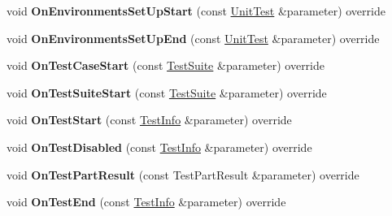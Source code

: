 \begin{DoxyCompactItemize}
void {\bfseries On\+Environments\+Set\+Up\+Start} (const \mbox{\hyperlink{classtesting_1_1UnitTest}{Unit\+Test}} \&parameter) override
\item 
\mbox{\label{classtesting_1_1internal_1_1TestEventRepeater_a82deba4c0631274c7a519b15e57b7d8b}} 
void {\bfseries On\+Environments\+Set\+Up\+End} (const \mbox{\hyperlink{classtesting_1_1UnitTest}{Unit\+Test}} \&parameter) override
\item 
\mbox{\label{classtesting_1_1internal_1_1TestEventRepeater_a76cf742eacd1c048b81dc3a1138f55ab}} 
void {\bfseries On\+Test\+Case\+Start} (const \mbox{\hyperlink{classtesting_1_1TestSuite}{Test\+Suite}} \&parameter) override
\item 
\mbox{\label{classtesting_1_1internal_1_1TestEventRepeater_aa54fdafe6dfdd46dbac108c17016a5f9}} 
void {\bfseries On\+Test\+Suite\+Start} (const \mbox{\hyperlink{classtesting_1_1TestSuite}{Test\+Suite}} \&parameter) override
\item 
\mbox{\label{classtesting_1_1internal_1_1TestEventRepeater_a17b0fcb394e3b967230d059fc83f5589}} 
void {\bfseries On\+Test\+Start} (const \mbox{\hyperlink{classtesting_1_1TestInfo}{Test\+Info}} \&parameter) override
\item 
\mbox{\label{classtesting_1_1internal_1_1TestEventRepeater_ae2573a45c4503fdcd0b064d3c095a4e7}} 
void {\bfseries On\+Test\+Disabled} (const \mbox{\hyperlink{classtesting_1_1TestInfo}{Test\+Info}} \&parameter) override
\item 
\mbox{\label{classtesting_1_1internal_1_1TestEventRepeater_a68b441d896a923472abbd370b2c31e92}} 
void {\bfseries On\+Test\+Part\+Result} (const Test\+Part\+Result \&parameter) override
\item 
\mbox{\label{classtesting_1_1internal_1_1TestEventRepeater_a7865f96e569221c58c06cda243eed55d}} 
void {\bfseries On\+Test\+End} (const \mbox{\hyperlink{classtesting_1_1TestInfo}{Test\+Info}} \&parameter) override

\end{DoxyCompactItemize}
